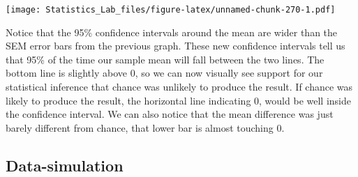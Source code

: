 \documentclass[
]{book}
\newenvironment{Shaded}{\begin{snugshade}}{\end{snugshade}}
\newcommand{\AttributeTok}[1]{\textcolor[rgb]{0.77,0.63,0.00}{#1}}
\newcommand{\DecValTok}[1]{\textcolor[rgb]{0.00,0.00,0.81}{#1}}
\newcommand{\FunctionTok}[1]{\textcolor[rgb]{0.00,0.00,0.00}{#1}}
\newcommand{\NormalTok}[1]{#1}
\newcommand{\OtherTok}[1]{\textcolor[rgb]{0.56,0.35,0.01}{#1}}
\newcommand{\SpecialCharTok}[1]{\textcolor[rgb]{0.00,0.00,0.00}{#1}}
\newcommand{\StringTok}[1]{\textcolor[rgb]{0.31,0.60,0.02}{#1}}
\begin{document}
\begin{Shaded}
\end{Shaded}

\texttt{[image: Statistics\_Lab\_files/figure-latex/unnamed-chunk-270-1.pdf]}

Notice that the 95\% confidence intervals around the mean are wider than the SEM error bars from the previous graph. These new confidence intervals tell us that 95\% of the time our sample mean will fall between the two lines. The bottom line is slightly above 0, so we can now visually see support for our statistical inference that chance was unlikely to produce the result. If chance was likely to produce the result, the horizontal line indicating 0, would be well inside the confidence interval. We can also notice that the mean difference was just barely different from chance, that lower bar is almost touching 0.

\hypertarget{data-simulation}{%
\subsection{Data-simulation}\label{data-simulation}}
\end{document}
